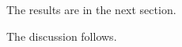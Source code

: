 \documentclass{article}
\begin{document}
The results are in the next section.

The discussion follows.
\end{document}
